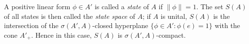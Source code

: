 A positive linear form $\phi \in A'$ is called a \textit{state} of $A$ if $\|\phi\| = 1$. The set $S(A)$ of all states is then called the \textit{state space} of $A$; if $A$ is unital, $S(A)$ is the intersection of the $\sigma(A', A)$-closed hyperplane $\{\phi \in A' : \phi(e) = 1\}$ with the cone $A'_+$. Hence in this case, $S(A)$ is $\sigma(A', A)$-compact.
